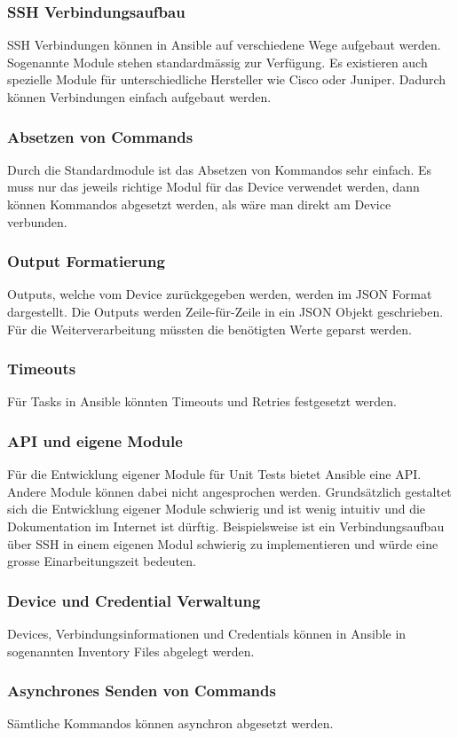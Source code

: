 \documentclass[a4,12pt]{scrartcl}
\begin{document}
\subsubsection{SSH Verbindungsaufbau}
SSH Verbindungen können in Ansible auf verschiedene Wege aufgebaut werden. Sogenannte Module stehen standardmässig zur Verfügung. Es existieren auch spezielle Module für unterschiedliche Hersteller wie Cisco oder Juniper. Dadurch können Verbindungen einfach aufgebaut werden.
\subsubsection{Absetzen von Commands}
Durch die Standardmodule ist das Absetzen von Kommandos sehr einfach. Es muss nur das jeweils richtige Modul für das Device verwendet werden, dann können Kommandos abgesetzt werden, als wäre man direkt am Device verbunden. 
\subsubsection{Output Formatierung}
Outputs, welche vom Device zurückgegeben werden, werden im JSON Format dargestellt. Die Outputs werden Zeile-für-Zeile in ein JSON Objekt geschrieben. Für die Weiterverarbeitung müssten die benötigten Werte geparst werden.
\subsubsection{Timeouts}
Für Tasks in Ansible könnten Timeouts und Retries festgesetzt werden.
\subsubsection{API und eigene Module}
Für die Entwicklung eigener Module für Unit Tests bietet Ansible eine API. Andere Module können dabei nicht angesprochen werden. Grundsätzlich gestaltet sich die Entwicklung eigener Module schwierig und ist wenig intuitiv und die Dokumentation im Internet ist dürftig. Beispielsweise ist ein Verbindungsaufbau über SSH in einem eigenen Modul schwierig zu implementieren und würde eine grosse Einarbeitungszeit bedeuten.
\subsubsection{Device und Credential Verwaltung}
Devices, Verbindungsinformationen und Credentials können in Ansible in sogenannten Inventory Files abgelegt werden. 
\subsubsection{Asynchrones Senden von Commands}
Sämtliche Kommandos können asynchron abgesetzt werden.
\newpage
\end{document}
